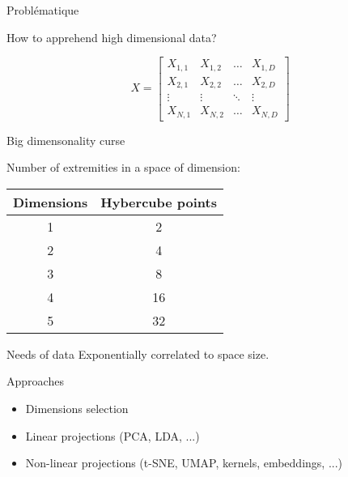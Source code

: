 \begin{frame}{Problématique}
    \begin{center}
      How to apprehend high dimensional data?
    \end{center}
    \[
    X = \begin{bmatrix}
      X_{1,1} & X_{1,2} & \dots  & X_{1,D} \\
      X_{2,1} & X_{2,2} & \dots  & X_{2,D} \\
      \vdots & \vdots & \ddots & \vdots \\
      X_{N,1} & X_{N,2} & \dots  & X_{N,D}
    \end{bmatrix}
    \]
\end{frame}

\begin{frame}{Big dimensonality curse}
    \begin{center}
      Number of extremities in a space of dimension: \\
      $\;$ \\
      \begin{tabular}{cc}
        Dimensions & Hybercube points \\
        \midrule
        1 & 2 \\
        2 & 4 \\
        3 & 8 \\
        4 & 16 \\
        5 & 32 \\
      \end{tabular}
    \end{center}

  \begin{alertblock}{Needs of data}
    Exponentially correlated to space size.
  \end{alertblock}
\end{frame}

\begin{frame}{Approaches}
  \begin{itemize}
  \item Dimensions selection
  \item Linear projections (PCA, LDA, ...)
  \item Non-linear projections (t-SNE, UMAP, kernels, embeddings, ...)
  \end{itemize}
\end{frame}
